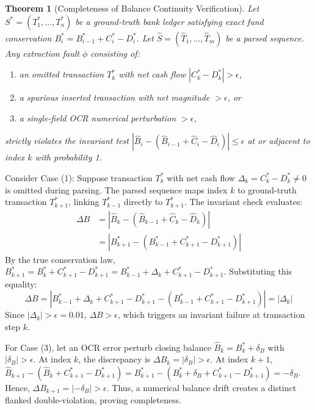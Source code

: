 \documentclass[conference]{IEEEtran}
\newtheorem{theorem}{Theorem}
\begin{document}
\begin{theorem}[Completeness of Balance Continuity Verification]
\label{thm:continuity}
Let $S^* = (T_1^*, \dots, T_n^*)$ be a ground-truth bank ledger satisfying exact fund conservation $B_i^* = B_{i-1}^* + C_i^* - D_i^*$. Let $\widehat{S} = (\widehat{T}_1, \dots, \widehat{T}_m)$ be a parsed sequence. Any extraction fault $\phi$ consisting of:
\begin{enumerate}
    \item an omitted transaction $T_k^*$ with net cash flow $|C_k^* - D_k^*| > \epsilon$,
    \item a spurious inserted transaction with net magnitude $> \epsilon$, or
    \item a single-field OCR numerical perturbation $> \epsilon$,
\end{enumerate}
strictly violates the invariant test $| \widehat{B}_i - (\widehat{B}_{i-1} + \widehat{C}_i - \widehat{D}_i) | \le \epsilon$ at or adjacent to index $k$ with probability 1.
\end{theorem}

\begin{IEEEproof}
Consider Case (1): Suppose transaction $T_k^*$ with net cash flow $\Delta_k = C_k^* - D_k^* \neq 0$ is omitted during parsing. The parsed sequence maps index $k$ to ground-truth transaction $T_{k+1}^*$, linking $T_{k-1}^*$ directly to $T_{k+1}^*$. The invariant check evaluates:
\begin{align*}
\Delta B &= | \widehat{B}_k - (\widehat{B}_{k-1} + \widehat{C}_k - \widehat{D}_k) | \\
&= | B_{k+1}^* - (B_{k-1}^* + C_{k+1}^* - D_{k+1}^*) |
\end{align*}
By the true conservation law, $B_{k+1}^* = B_k^* + C_{k+1}^* - D_{k+1}^* = B_{k-1}^* + \Delta_k + C_{k+1}^* - D_{k+1}^*$. Substituting this equality:
\begin{equation}
\Delta B = | B_{k-1}^* + \Delta_k + C_{k+1}^* - D_{k+1}^* - (B_{k-1}^* + C_{k+1}^* - D_{k+1}^*) | = |\Delta_k|
\end{equation}
Since $|\Delta_k| > \epsilon = 0.01$, $\Delta B > \epsilon$, which triggers an invariant failure at transaction step $k$.

For Case (3), let an OCR error perturb closing balance $\widehat{B}_k = B_k^* + \delta_B$ with $|\delta_B| > \epsilon$. At index $k$, the discrepancy is $\Delta B_k = |\delta_B| > \epsilon$. At index $k+1$, $\widehat{B}_{k+1} - (\widehat{B}_k + C_{k+1}^* - D_{k+1}^*) = B_{k+1}^* - (B_k^* + \delta_B + C_{k+1}^* - D_{k+1}^*) = -\delta_B$. Hence, $\Delta B_{k+1} = |-\delta_B| > \epsilon$. Thus, a numerical balance drift creates a distinct flanked double-violation, proving completeness.
\end{IEEEproof}
\end{document}
